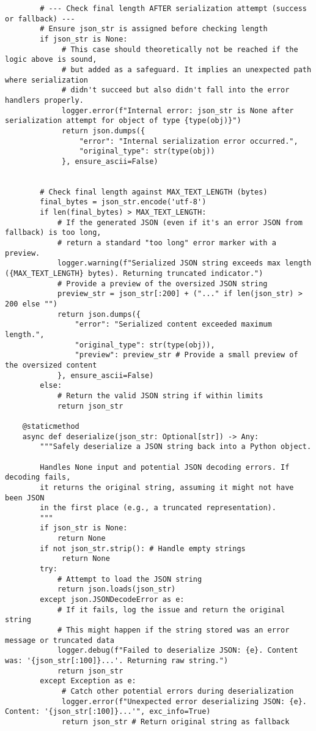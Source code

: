 \documentclass[12pt,a4paper]{article}
\begin{document}
\begin{pageablecode}
\begin{verbatim}
        # --- Check final length AFTER serialization attempt (success or fallback) ---
        # Ensure json_str is assigned before checking length
        if json_str is None:
             # This case should theoretically not be reached if the logic above is sound,
             # but added as a safeguard. It implies an unexpected path where serialization
             # didn't succeed but also didn't fall into the error handlers properly.
             logger.error(f"Internal error: json_str is None after serialization attempt for object of type {type(obj)}")
             return json.dumps({
                 "error": "Internal serialization error occurred.",
                 "original_type": str(type(obj))
             }, ensure_ascii=False)


        # Check final length against MAX_TEXT_LENGTH (bytes)
        final_bytes = json_str.encode('utf-8')
        if len(final_bytes) > MAX_TEXT_LENGTH:
            # If the generated JSON (even if it's an error JSON from fallback) is too long,
            # return a standard "too long" error marker with a preview.
            logger.warning(f"Serialized JSON string exceeds max length ({MAX_TEXT_LENGTH} bytes). Returning truncated indicator.")
            # Provide a preview of the oversized JSON string
            preview_str = json_str[:200] + ("..." if len(json_str) > 200 else "")
            return json.dumps({
                "error": "Serialized content exceeded maximum length.",
                "original_type": str(type(obj)),
                "preview": preview_str # Provide a small preview of the oversized content
            }, ensure_ascii=False)
        else:
            # Return the valid JSON string if within limits
            return json_str

    @staticmethod
    async def deserialize(json_str: Optional[str]) -> Any:
        """Safely deserialize a JSON string back into a Python object.

        Handles None input and potential JSON decoding errors. If decoding fails,
        it returns the original string, assuming it might not have been JSON
        in the first place (e.g., a truncated representation).
        """
        if json_str is None:
            return None
        if not json_str.strip(): # Handle empty strings
             return None
        try:
            # Attempt to load the JSON string
            return json.loads(json_str)
        except json.JSONDecodeError as e:
            # If it fails, log the issue and return the original string
            # This might happen if the string stored was an error message or truncated data
            logger.debug(f"Failed to deserialize JSON: {e}. Content was: '{json_str[:100]}...'. Returning raw string.")
            return json_str
        except Exception as e:
             # Catch other potential errors during deserialization
             logger.error(f"Unexpected error deserializing JSON: {e}. Content: '{json_str[:100]}...'", exc_info=True)
             return json_str # Return original string as fallback


\end{verbatim}
\end{pageablecode}
\end{document}
